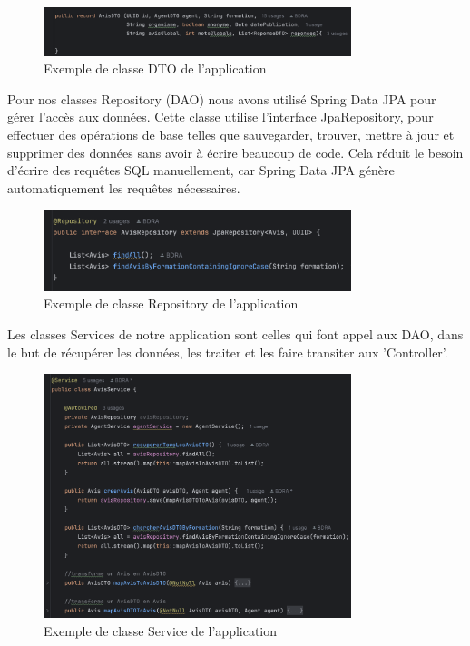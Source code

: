         \begin{figure}[h!]
            \centering
            \includegraphics[width=0.8\textwidth]{images/code/AvisDTO.png}
            \caption{Exemple de classe DTO de l'application}
        \end{figure}\vspace{1cm}


        Pour nos classes Repository (DAO) nous avons utilisé Spring Data JPA pour gérer l'accès aux données. Cette classe utilise l'interface JpaRepository, pour effectuer des opérations de base telles que sauvegarder, trouver, mettre à jour et supprimer des données sans avoir à écrire beaucoup de code. 
        Cela réduit le besoin d'écrire des requêtes SQL manuellement, car Spring Data JPA génère automatiquement les requêtes nécessaires.\medskip

        \begin{figure}[h!]
            \centering
            \includegraphics[width=0.8\textwidth]{images/code/DAOAvis.png}
            \caption{Exemple de classe Repository de l'application}
        \end{figure}
        \vspace{1cm}

        Les classes Services de notre application sont celles qui font appel aux DAO, dans le but de récupérer les données, les traiter et les faire transiter aux 'Controller'.
        \medskip

        \begin{figure}[h!]
            \centering
            \includegraphics[width=0.8\textwidth]{images/code/avisService.png}
            \caption{Exemple de classe Service de l'application}
        \end{figure}\medskip

